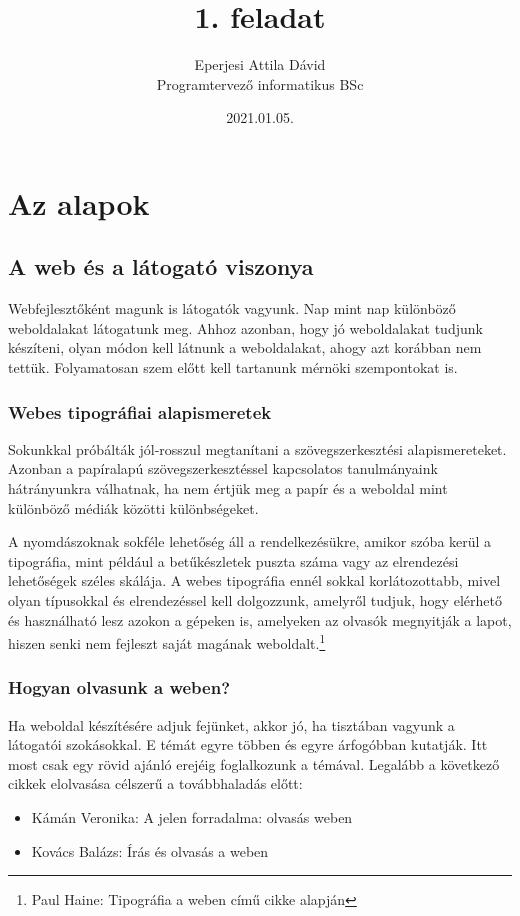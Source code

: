 \documentclass[12pt,twoside]{report}
\theoremstyle{definition}
\begin{document}
	\title{1. feladat}
	\author{Eperjesi Attila Dávid\\Programtervező informatikus BSc}
	\date{2021.01.05.}
	\maketitle
	\tableofcontents
	\chapter{Az alapok}
	\section{A web és a látogató viszonya}
	Webfejlesztőként magunk is látogatók vagyunk. Nap mint nap különböző weboldalakat látogatunk meg. Ahhoz azonban, hogy jó weboldalakat tudjunk készíteni, olyan módon kell látnunk a weboldalakat, ahogy azt korábban nem tettük. Folyamatosan szem előtt kell tartanunk mérnöki szempontokat is.
	\subsection{Webes tipográfiai alapismeretek}
	Sokunkkal próbálták jól-rosszul megtanítani a szövegszerkesztési alapismereteket. Azonban a papíralapú szövegszerkesztéssel kapcsolatos tanulmányaink hátrányunkra válhatnak, ha nem értjük meg a papír és a weboldal mint különböző médiák közötti különbségeket.
	
	A nyomdászoknak sokféle lehetőség áll a rendelkezésükre, amikor szóba kerül a tipográfia, mint például a betűkészletek puszta száma vagy az elrendezési lehetőségek széles skálája. A webes tipográfia ennél sokkal korlátozottabb, mivel olyan típusokkal és elrendezéssel kell dolgozzunk, amelyről tudjuk, hogy elérhető és használható lesz azokon a gépeken is, amelyeken az olvasók megnyitják a lapot, hiszen senki nem fejleszt saját magának weboldalt.\footnote{Paul Haine: Tipográfia a weben című cikke alapján}
	\subsection{Hogyan olvasunk a weben?}
	Ha weboldal készítésére adjuk fejünket, akkor jó, ha tisztában vagyunk a látogatói szokásokkal. E témát egyre többen és egyre árfogóbban kutatják. Itt most csak egy rövid ajánló erejéig foglalkozunk a témával. Legalább a következő cikkek elolvasása célszerű a továbbhaladás előtt:
	\begin{itemize}
		\item Kámán Veronika: A jelen forradalma: olvasás weben
		\item Kovács Balázs: Írás és olvasás a weben
	\end{itemize}
\end{document}
